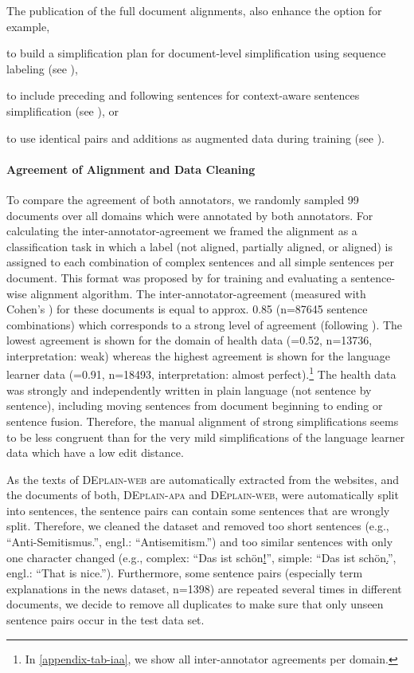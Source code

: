 \documentclass[11pt]{article}
\begin{document}
The publication of the full document alignments, also enhance the option for example, 
\begin{enumerate*}[label=\roman*)]
    \item to build a simplification plan for document-level simplification using sequence labeling (see \citealt{cripwell-etal-2023-document}), 
    \item to include preceding and following sentences for context-aware sentences simplification (see \citealt{sun-etal-2020-helpfulness}), or 
    \item to use identical pairs and additions as augmented data during training (see \citealt{palmero-aprosio-etal-2019-neural}).
\end{enumerate*}

\paragraph{Agreement of Alignment and Data Cleaning}
To compare the agreement of both annotators, we randomly sampled 99 documents over all domains which were annotated by both annotators. For calculating the inter-annotator-agreement we framed the alignment as a classification task in which a label (not aligned, partially aligned, or aligned) is assigned to each combination of complex sentences and all simple sentences per document. This format was proposed by \citet{jiang-etal-2020-neural}  for training and evaluating a sentence-wise alignment algorithm. The  inter-annotator-agreement (measured with Cohen's ) for these documents is equal to approx. 0.85 (n=87645 sentence combinations) which corresponds to a strong level of agreement (following \citet[p. 279]{mchugh2012interrater}). The lowest agreement is shown for the domain of health data (=0.52, n=13736, interpretation: weak) whereas the highest agreement is shown for the language learner data (=0.91, n=18493, interpretation: almost perfect).\footnote{In \autoref{appendix-tab-iaa}, we show all inter-annotator agreements per domain. } 
The health data was strongly and independently written in plain language (not sentence by sentence), including moving sentences from document beginning to ending or sentence fusion. Therefore, the manual alignment of strong simplifications seems to be less congruent than for the very mild simplifications of the language learner data which have a low edit distance. 

As the texts of \textsc{DEplain-web} are automatically extracted from the websites, and the documents of both, \textsc{DEplain-apa} and \textsc{DEplain-web}, were automatically split into sentences, the sentence pairs can contain some sentences that are wrongly split. Therefore, we cleaned the dataset and removed too short sentences (e.g., ``Anti-Semitismus.'', engl.: ``Antisemitism.'') and too similar sentences with only one character changed (e.g., complex: ``Das ist schön\underline{!}'', simple: ``Das ist schön\underline{.}'', engl.: ``That is nice.''). Furthermore, some sentence pairs (especially term explanations in the news dataset, n=1398) are repeated several times in different documents, we decide to remove all duplicates  to make sure that only unseen sentence pairs occur in the test data set.
\end{document}
